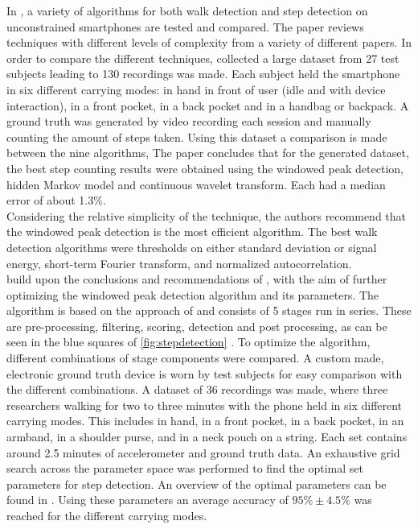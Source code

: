 In \cite{Brajdic2013}, a variety of algorithms for both walk detection and step detection on unconstrained smartphones are tested and compared. The paper reviews techniques with different levels of complexity from a variety of different papers. In order to compare the different techniques, \citet{Brajdic2013} collected a large dataset from 27 test subjects leading to 130 recordings was made. Each subject held the smartphone in six different carrying modes: in 
hand in front of user (idle and with device interaction), in a front pocket, in a back pocket and in a handbag or backpack. A ground truth was generated by video recording each session and manually counting the amount of steps taken. Using this dataset a comparison is made between the nine algorithms, 
\newline
The paper concludes that for the generated dataset, the best step counting results were obtained using the windowed peak detection, hidden Markov model and continuous wavelet transform. Each had a median error of about 1.3\%.\\
Considering the relative simplicity of the technique, the authors recommend that the windowed peak detection is the most efficient algorithm. The best walk detection algorithms were thresholds on either standard deviation or signal energy,  short-term Fourier transform, and normalized autocorrelation.\\
\citet{Salvi2018} build upon the conclusions and recommendations of \citet{Brajdic2013}, with the aim of further optimizing the windowed peak detection algorithm and its parameters. The algorithm is based on the approach of \citet{Palshikar2009} and consists of 5 stages run in series. These are pre-processing, filtering, scoring, detection and post processing, as can be seen in the blue squares of \cref{fig:stepdetection} . To optimize the algorithm, different combinations of stage components were compared. A custom made, electronic ground truth device is worn by test subjects for easy comparison with the different combinations. A dataset of 36 recordings was made,  where three researchers walking for two to three minutes with the phone held in six different carrying modes. This includes in hand, in a front pocket, in a back pocket, in an armband, in a shoulder purse, and in a neck pouch on a string. Each set contains around 2.5 minutes of accelerometer and ground truth data. An exhaustive grid search across the parameter space was performed to find the optimal set parameters for step detection. An overview of the optimal parameters can be found in . Using these parameters an average accuracy of $95\% \pm 4.5\%$ was reached for the different carrying modes.


